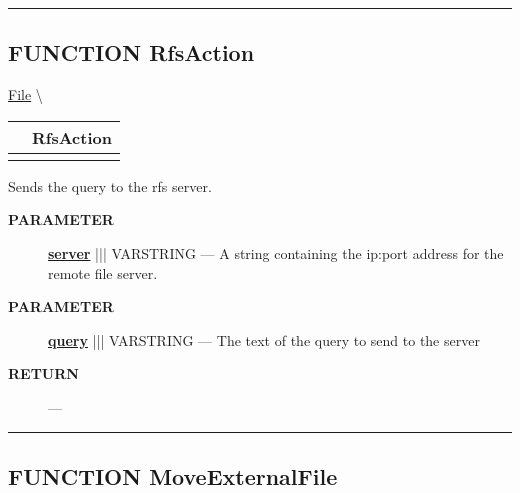 \rule{\linewidth}{0.5pt}
\subsection*{\textsf{\colorbox{headtoc}{\color{white} FUNCTION}
RfsAction}}

\hypertarget{ecldoc:file.rfsaction}{}
\hspace{0pt} \hyperlink{ecldoc:File}{File} \textbackslash 

{\renewcommand{\arraystretch}{1.5}
\begin{tabularx}{\textwidth}{|>{\raggedright\arraybackslash}l|X|}
\hline
\hspace{0pt}\mytexttt{\color{red} } & \textbf{RfsAction} \\
\hline
\multicolumn{2}{|>{\raggedright\arraybackslash}X|}{\hspace{0pt}\mytexttt{\color{param} (varstring server, varstring query)}} \\
\hline
\end{tabularx}
}

\par





Sends the query to the rfs server.






\par
\begin{description}
\item [\colorbox{tagtype}{\color{white} \textbf{\textsf{PARAMETER}}}] \textbf{\underline{server}} ||| VARSTRING --- A string containing the ip:port address for the remote file server.
\item [\colorbox{tagtype}{\color{white} \textbf{\textsf{PARAMETER}}}] \textbf{\underline{query}} ||| VARSTRING --- The text of the query to send to the server
\end{description}







\par
\begin{description}
\item [\colorbox{tagtype}{\color{white} \textbf{\textsf{RETURN}}}] \textbf{} --- 
\end{description}




\rule{\linewidth}{0.5pt}
\subsection*{\textsf{\colorbox{headtoc}{\color{white} FUNCTION}
MoveExternalFile}}

